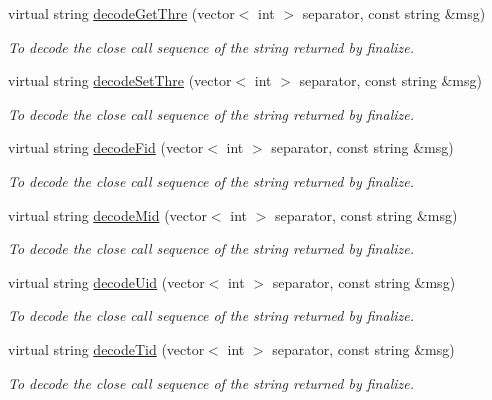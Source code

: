 \begin{DoxyCompactItemize}
virtual string \hyperlink{classIMSMapper_a783156c222eacd5be72bdf7ad00d2481}{decodeGetThre} (vector$<$ int $>$ separator, const string \&msg)
\begin{DoxyCompactList}\small\item\em To decode the close call sequence of the string returned by finalize. \item\end{DoxyCompactList}\item 
virtual string \hyperlink{classIMSMapper_a87686fec5fdf92f365230a209f9b2c4b}{decodeSetThre} (vector$<$ int $>$ separator, const string \&msg)
\begin{DoxyCompactList}\small\item\em To decode the close call sequence of the string returned by finalize. \item\end{DoxyCompactList}\item 
virtual string \hyperlink{classIMSMapper_a04db35d8ada7dcb3ffe6dc64d4e4fd8f}{decodeFid} (vector$<$ int $>$ separator, const string \&msg)
\begin{DoxyCompactList}\small\item\em To decode the close call sequence of the string returned by finalize. \item\end{DoxyCompactList}\item 
virtual string \hyperlink{classIMSMapper_ad7979ec5031fca19e89820740e79d99b}{decodeMid} (vector$<$ int $>$ separator, const string \&msg)
\begin{DoxyCompactList}\small\item\em To decode the close call sequence of the string returned by finalize. \item\end{DoxyCompactList}\item 
virtual string \hyperlink{classIMSMapper_abc943e621369332d9a03f9819d85fcbc}{decodeUid} (vector$<$ int $>$ separator, const string \&msg)
\begin{DoxyCompactList}\small\item\em To decode the close call sequence of the string returned by finalize. \item\end{DoxyCompactList}\item 
virtual string \hyperlink{classIMSMapper_a7d6379e366a7271871a2916f01f4dfc2}{decodeTid} (vector$<$ int $>$ separator, const string \&msg)
\begin{DoxyCompactList}\small\item\em To decode the close call sequence of the string returned by finalize. \item\end{DoxyCompactList}\item 

\end{DoxyCompactItemize}
